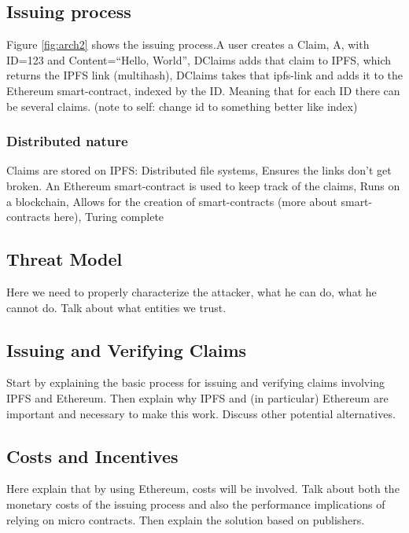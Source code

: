 \documentclass[letterpaper,twocolumn,10pt]{article}
\begin{document}
\subsection{Issuing process}

Figure \ref{fig:arch2} shows the issuing process.A user creates a Claim, A, with ID=123 and Content=“Hello, World”, DClaims adds that claim to IPFS, which returns the IPFS link (multihash), DClaims takes that ipfs-link and adds it to the Ethereum smart-contract, indexed by the ID. Meaning that for each ID there can be several claims. (note to self: change id to something better like index)

\subsubsection{Distributed nature}

Claims are stored on IPFS: Distributed file systems, Ensures the links don’t get broken.
An Ethereum smart-contract is used to keep track of the claims, Runs on a blockchain, Allows for the creation of smart-contracts (more about smart-contracts here), Turing complete


\subsection{Threat Model}

Here we need to properly characterize the attacker, what he can do, what he cannot do. Talk about what entities we trust.


\subsection{Issuing and Verifying Claims}

Start by explaining the basic process for issuing and verifying claims involving IPFS and Ethereum. Then explain why IPFS and (in particular) Ethereum are important and necessary to make this work. Discuss other potential alternatives.


\subsection{Costs and Incentives}

Here explain that by using Ethereum, costs will be involved. Talk about both the monetary costs of the issuing process and also the performance implications of relying on micro contracts. Then explain the solution based on publishers.
\end{document}
